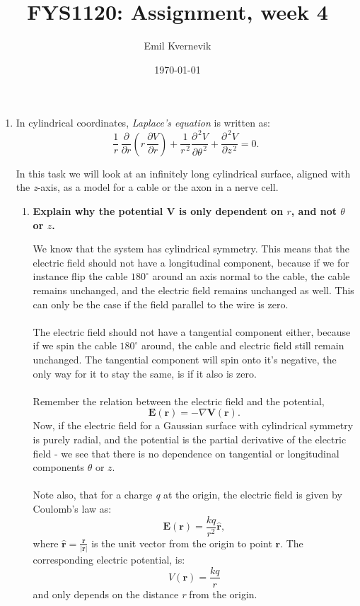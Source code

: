 \documentclass[12pt]{article}
\title{FYS1120: Assignment, week 4}
\author{Emil Kvernevik}
\date{\today}
\begin{document}
\maketitle
\begin{enumerate}[leftmargin=\labelsep]
\item In cylindrical coordinates, \emph{Laplace's equation} is written as:
    \begin{equation*}
    \displaystyle \frac{1}{r}\,\frac{\partial}{\partial r}\left(r\,\frac{\partial V}{\partial r}\right)+\frac{1}{r^{\,2}}\frac{\partial^{\,2} V}{\partial\theta^{\,2}}+\frac{\partial^{\,2} V}{\partial z^{\,2}}=0.
    \end{equation*}
    
    In this task we will look at an infinitely long cylindrical surface, aligned with the \emph{z}-axis, as a model for a cable or the axon in a nerve cell.
    
    \begin{enumerate}
    \item \textbf{Explain why the potential V is only dependent on $r$, and not $\theta$ or $z$.}

    We know that the system has cylindrical symmetry. This means that the electric field should not have a longitudinal component, because if we for instance flip the cable $180^{\circ}$ around an axis normal to the cable, the cable remains unchanged, and the electric field remains unchanged as well. This can only be the case if the field parallel to the wire is zero. 
    \\
    \\
    The electric field should not have a tangential component either, because if we spin the cable $180^{\circ}$ around, the cable and electric field still remain unchanged. The tangential component will spin onto it's negative, the only way for it to stay the same, is if it also is zero.
    \\
    \\
    Remember the relation between the electric field and the potential,
    \begin{equation*}
        \mathbf{E}(\mathbf{r})=-\nabla \mathbf{V} (\mathbf{r}).
    \end{equation*}
    Now, if the electric field for a Gaussian surface with cylindrical symmetry is purely radial, and the potential is the partial derivative of the electric field - we see that there is no dependence on tangential or longitudinal components $\theta$ or $z$.
    \\
    \\
    Note also, that for a charge \emph{q} at the origin, the electric field is given by Coulomb's law as:
    \begin{equation*}
        \mathbf{E}(\mathbf{r})=\frac{kq}{r^2}\hat{\mathbf{r}},
    \end{equation*}
    where $\hat{\mathbf{r}}=\frac{\mathbf{r}}{|\mathbf{r}|}$ is the unit vector from the origin to point $\mathbf{r}$. The corresponding electric potential, is:
    \begin{equation*}
        V(\mathbf{r})= \frac{kq}{r}
    \end{equation*}
    and only depends on the distance \emph{r} from the origin.


\end{enumerate}
\end{enumerate}
\end{document}
